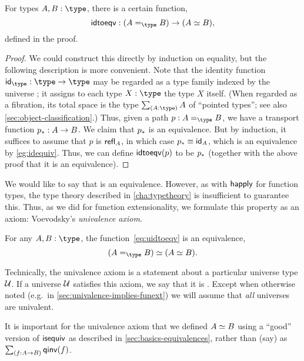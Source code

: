 \begin{lem}
  For types $A,B:\type$, there is a certain function,
  \begin{equation}\label{eq:uidtoeqv}
    \idtoeqv : (\id[\type]AB) \to (\eqv A B),
  \end{equation}
  defined in the proof.
\end{lem}
\begin{proof}
  We could construct this directly by induction on equality, but the following description is more convenient.
  Note that the identity function $\idfunc[\type]:\type\to\type$ may be regarded as a type family indexed by the universe \type; it assigns to each type $X:\type$ the type $X$ itself.
  (When regarded as a fibration, its total space is the type $\sm{A:\type}A$ of ``pointed types''; see also \autoref{sec:object-classification}.)
  Thus, given a path $p:A =_\type B$, we have a transport function $\transf{p}:A \to B$.
  We claim that $\transf{p}$ is an equivalence.
  But by induction, it suffices to assume that $p$ is $\refl A$, in which case $\transf{p} \jdeq \idfunc[A]$, which is an equivalence by \autoref{eg:idequiv}.
  Thus, we can define $\idtoeqv(p)$ to be $\transf{p}$ (together with the above proof that it is an equivalence).
\end{proof}

We would like to say that \idtoeqv is an equivalence.
However, as with $\happly$ for function types, the type theory described in \autoref{cha:typetheory} is insufficient to guarantee this.
Thus, as we did for function extensionality, we formulate this property as an axiom: Voevodsky's \emph{univalence axiom}.

\begin{axiom}[Univalence]\label{axiom:univalence}
  For any $A,B:\type$, the function~\eqref{eq:uidtoeqv} is an equivalence,
  \[
\eqv{(\id[\type]{A}{B})}{(\eqv A B)}.
\]
\end{axiom}

Technically, the univalence axiom is a statement about a particular universe type $\UU$.
If a universe $\UU$ satisfies this axiom, we say that it is .
%
%
Except when otherwise noted (e.g.\ in \autoref{sec:univalence-implies-funext}) we will assume that \emph{all} universes are univalent.

\begin{rmk}
  It is important for the univalence axiom that we defined $\eqv AB$ using a ``good'' version of $\isequiv$ as described in \autoref{sec:basics-equivalences}, rather than (say) as $\sm{f:A\to B} \qinv(f)$.
\end{rmk}

